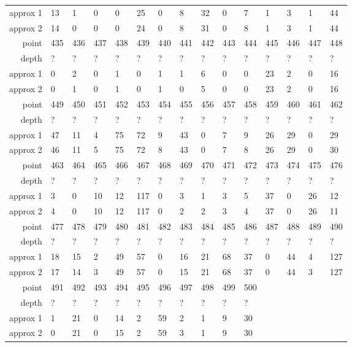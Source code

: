 \begin{center}
\begin{supertabular}{|r|l l l l l l l l l l l l l l|}
approx 1 & 13 & 1 & 0 & 0 & 25 & 0 & 8 & 32 & 0 & 7 & 1 & 3 & 1 & 44 \\
approx 2 & 14 & 0 & 0 & 0 & 24 & 0 & 8 & 31 & 0 & 8 & 1 & 3 & 1 & 44 \\
\hline
point & 435 & 436 & 437 & 438 & 439 & 440 & 441 & 442 & 443 & 444 & 445 & 446 & 447 & 448 \\
\hline
depth & ? & ? & ? & ? & ? & ? & ? & ? & ? & ? & ? & ? & ? & ? \\
approx 1 & 0 & 2 & 0 & 1 & 0 & 1 & 1 & 6 & 0 & 0 & 23 & 2 & 0 & 16 \\
approx 2 & 0 & 1 & 0 & 1 & 0 & 1 & 0 & 5 & 0 & 0 & 23 & 2 & 0 & 16 \\
\hline
point & 449 & 450 & 451 & 452 & 453 & 454 & 455 & 456 & 457 & 458 & 459 & 460 & 461 & 462 \\
\hline
depth & ? & ? & ? & ? & ? & ? & ? & ? & ? & ? & ? & ? & ? & ? \\
approx 1 & 47 & 11 & 4 & 75 & 72 & 9 & 43 & 0 & 7 & 9 & 26 & 29 & 0 & 29 \\
approx 2 & 46 & 11 & 5 & 75 & 72 & 8 & 43 & 0 & 7 & 8 & 26 & 29 & 0 & 30 \\
\hline
point & 463 & 464 & 465 & 466 & 467 & 468 & 469 & 470 & 471 & 472 & 473 & 474 & 475 & 476 \\
\hline
depth & ? & ? & ? & ? & ? & ? & ? & ? & ? & ? & ? & ? & ? & ? \\
approx 1 & 3 & 0 & 10 & 12 & 117 & 0 & 3 & 1 & 3 & 5 & 37 & 0 & 26 & 12 \\
approx 2 & 4 & 0 & 10 & 12 & 117 & 0 & 2 & 2 & 3 & 4 & 37 & 0 & 26 & 11 \\
\hline
point & 477 & 478 & 479 & 480 & 481 & 482 & 483 & 484 & 485 & 486 & 487 & 488 & 489 & 490 \\
\hline
depth & ? & ? & ? & ? & ? & ? & ? & ? & ? & ? & ? & ? & ? & ? \\
approx 1 & 18 & 15 & 2 & 49 & 57 & 0 & 16 & 21 & 68 & 37 & 0 & 44 & 4 & 127 \\
approx 2 & 17 & 14 & 3 & 49 & 57 & 0 & 15 & 21 & 68 & 37 & 0 & 44 & 3 & 127 \\
\hline
point & 491 & 492 & 493 & 494 & 495 & 496 & 497 & 498 & 499 & 500 & & & & \\
\hline
depth & ? & ? & ? & ? & ? & ? & ? & ? & ? & ? & & & & \\
approx 1 & 1 & 21 & 0 & 14 & 2 & 59 & 2 & 1 & 9 & 30 & & & & \\
approx 2 & 0 & 21 & 0 & 15 & 2 & 59 & 3 & 1 & 9 & 30 & & & & \\
\hline
  \end{supertabular}
  \label{tab:test.rand4d}
\end{center}

